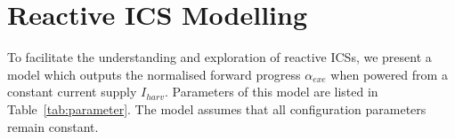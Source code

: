 
\section{Reactive ICS Modelling} \label{section:model}



To facilitate the understanding and exploration of reactive ICSs, we present a model which outputs the normalised forward progress $\alpha_{exe}$ when powered from a constant current supply $I_{harv}$. Parameters of this model are listed in Table~\ref{tab:parameter}. 
The model assumes that all configuration parameters remain constant. 

